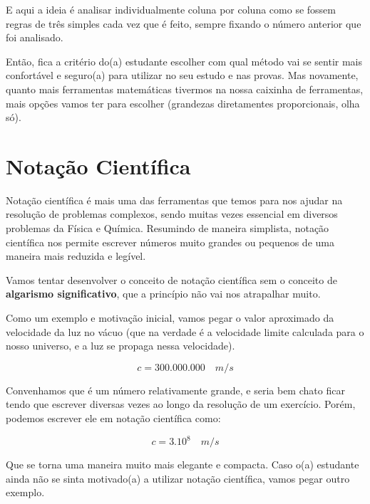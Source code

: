E aqui a ideia é analisar individualmente coluna por coluna como se fossem regras de três simples cada vez que é feito, sempre fixando o número anterior que foi analisado.

Então, fica a critério do(a) estudante escolher com qual método vai se sentir mais confortável e seguro(a) para utilizar no seu estudo e nas provas. Mas novamente, quanto mais ferramentas matemáticas tivermos na nossa caixinha de ferramentas, mais opções vamos ter para escolher (grandezas diretamentes proporcionais, olha só).

\newpage

\section{Notação Científica}

Notação científica é mais uma das ferramentas que temos para nos ajudar na resolução de problemas complexos, sendo muitas vezes essencial em diversos problemas da Física e Química. Resumindo de maneira simplista, notação científica nos permite escrever números muito grandes ou pequenos de uma maneira mais reduzida e legível. 

\begin{tcolorbox}[title = OBSERVAÇÃO]
    Vamos tentar desenvolver o conceito de notação científica sem o conceito de \textbf{algarismo significativo}, que a princípio não vai nos atrapalhar muito.
\end{tcolorbox}

Como um exemplo e motivação inicial, vamos pegar o valor aproximado da velocidade da luz no vácuo (que na verdade é a velocidade limite calculada para o nosso universo, e a luz se propaga nessa velocidade).

\begin{equation}
    c=300.000.000 \quad m/s
\end{equation}

Convenhamos que é um número relativamente grande, e seria bem chato ficar tendo que escrever diversas vezes ao longo da resolução de um exercício. Porém, podemos escrever ele em notação científica como:

\begin{equation}
    c=3.10^8 \quad m/s
\end{equation}

Que se torna uma maneira muito mais elegante e compacta. Caso o(a) estudante ainda não se sinta motivado(a) a utilizar notação científica, vamos pegar outro exemplo. 

